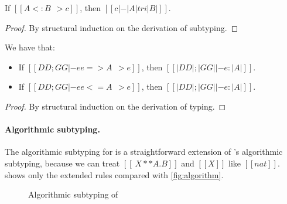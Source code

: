 \begin{lemma}
  If $[[A <: B ~~> c]]$, then $[[c |-  |A| tri |B|]]$.
  \label{lemma:sub-correct:fi}
\end{lemma}
\begin{proof}
  By structural induction on the derivation of subtyping.
\end{proof}


\begin{lemma} We have that:
  \begin{itemize}
  \item If $[[DD ; GG |- ee => A ~~> e]]$, then $[[ |DD| ; |GG| |- e : |A | ]]$.
  \item If $[[DD ; GG |- ee <= A ~~> e]]$, then $[[ |DD| ; |GG| |- e : |A | ]]$.
  \end{itemize}
\end{lemma}
\begin{proof}
  By structural induction on the derivation of typing.
\end{proof}



\paragraph{Algorithmic subtyping.}

The algorithmic subtyping for \fnamee is a straightforward extension of \namee's
algorithmic subtyping, because we can treat $[[ \ X ** A . B ]]$ and $[[X]]$
like $[[nat]]$.  shows only the extended rules compared
with \cref{fig:algorithm}.

\begin{figure}
  \centering
  \caption{Algorithmic subtyping of \fnamee}
  \label{fig:algo:sub:fi}
\end{figure}

